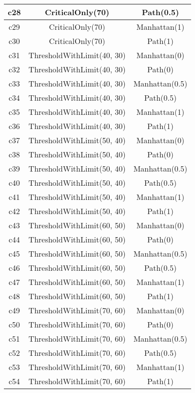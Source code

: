 \begin{table}[H]
\begin{tabular}{|c|c|c|}
\hline
c28 & CriticalOnly(70) & Path(0.5) \\
\hline
c29 & CriticalOnly(70) & Manhattan(1) \\
\hline
c30 & CriticalOnly(70) & Path(1) \\
\hline
c31 & ThresholdWithLimit(40, 30) & Manhattan(0) \\
\hline
c32 & ThresholdWithLimit(40, 30) & Path(0) \\
\hline
c33 & ThresholdWithLimit(40, 30) & Manhattan(0.5) \\
\hline
c34 & ThresholdWithLimit(40, 30) & Path(0.5) \\
\hline
c35 & ThresholdWithLimit(40, 30) & Manhattan(1) \\
\hline
c36 & ThresholdWithLimit(40, 30) & Path(1) \\
\hline
c37 & ThresholdWithLimit(50, 40) & Manhattan(0) \\
\hline
c38 & ThresholdWithLimit(50, 40) & Path(0) \\
\hline
c39 & ThresholdWithLimit(50, 40) & Manhattan(0.5) \\
\hline
c40 & ThresholdWithLimit(50, 40) & Path(0.5) \\
\hline
c41 & ThresholdWithLimit(50, 40) & Manhattan(1) \\
\hline
c42 & ThresholdWithLimit(50, 40) & Path(1) \\
\hline
c43 & ThresholdWithLimit(60, 50) & Manhattan(0) \\
\hline
c44 & ThresholdWithLimit(60, 50) & Path(0) \\
\hline
c45 & ThresholdWithLimit(60, 50) & Manhattan(0.5) \\
\hline
c46 & ThresholdWithLimit(60, 50) & Path(0.5) \\
\hline
c47 & ThresholdWithLimit(60, 50) & Manhattan(1) \\
\hline
c48 & ThresholdWithLimit(60, 50) & Path(1) \\
\hline
c49 & ThresholdWithLimit(70, 60) & Manhattan(0) \\
\hline
c50 & ThresholdWithLimit(70, 60) & Path(0) \\
\hline
c51 & ThresholdWithLimit(70, 60) & Manhattan(0.5) \\
\hline
c52 & ThresholdWithLimit(70, 60) & Path(0.5) \\
\hline
c53 & ThresholdWithLimit(70, 60) & Manhattan(1) \\
\hline
c54 & ThresholdWithLimit(70, 60) & Path(1) \\
\hline
\end{tabular}
\end{table}
